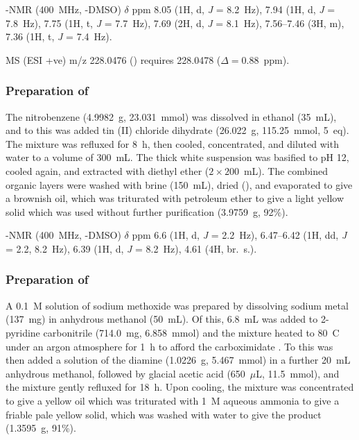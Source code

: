 \begin{refsection}
-NMR (400~MHz, -DMSO) $\delta$ ppm 8.05 (1H, d, \textit{J} = 8.2~Hz), 7.94 (1H, d, \textit{J} = 7.8~Hz), 7.75 (1H, t, \textit{J} = 7.7~Hz), 7.69 (2H, d, \textit{J} = 8.1~Hz), 7.56--7.46 (3H, m), 7.36 (1H, t, \textit{J} = 7.4~Hz).

MS (ESI +ve) m/z 228.0476 ()  requires 228.0478 ($\Delta=0.88$~ppm).

\subsubsection{Preparation of }
The nitrobenzene (4.9982~g, 23.031~mmol) was dissolved in ethanol (35~mL), and to this was added tin (II) chloride dihydrate (26.022~g, 115.25~mmol, 5~eq).
The mixture was refluxed for 8~h, then cooled, concentrated, and diluted with water to a volume of 300~mL.
The thick white suspension was basified to pH 12, cooled again, and extracted with diethyl ether ($2\times200$~mL).
The combined organic layers were washed with brine (150~mL), dried (), and evaporated to give a brownish oil, which was triturated with petroleum ether to give a light yellow solid which was used without further purification (3.9759~g, 92\%).\autocite{Urban2011}

-NMR (400~MHz, -DMSO) $\delta$ ppm 6.6 (1H, d, \textit{J} = 2.2~Hz), 6.47--6.42 (1H, dd, \textit{J} = 2.2, 8.2~Hz), 6.39 (1H, d, \textit{J} = 8.2~Hz), 4.61 (4H, br.\ s.).

\subsubsection{Preparation of }
A 0.1~M solution of sodium methoxide was prepared by dissolving sodium metal (137~mg) in anhydrous methanol (50~mL).
Of this, 6.8~mL was added to 2-pyridine carbonitrile (714.0~mg, 6.858~mmol) and the mixture heated to 80~\degree{}C under an argon atmosphere for 1~h to afford the carboximidate .
To this was then added a solution of the diamine  (1.0226~g, 5.467~mmol) in a further 20~mL anhydrous methanol, followed by glacial acetic acid (650~$\mu$L, 11.5~mmol), and the mixture gently refluxed for 18~h.
Upon cooling, the mixture was concentrated to give a yellow oil which was triturated with 1~M aqueous ammonia to give a friable pale yellow solid, which was washed with water to give the product (1.3595~g, 91\%).\autocite{Conn2011}


\end{refsection}
